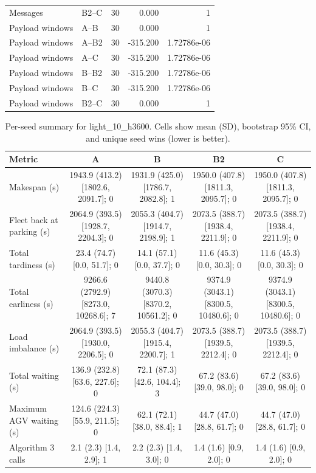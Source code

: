 \begin{table}[t]
\begin{tabular}{llrrr}
Messages & B2--C & 30 & 0.000 & 1 \\
Payload windows & A--B & 30 & 0.000 & 1 \\
Payload windows & A--B2 & 30 & -315.200 & 1.72786e-06 \\
Payload windows & A--C & 30 & -315.200 & 1.72786e-06 \\
Payload windows & B--B2 & 30 & -315.200 & 1.72786e-06 \\
Payload windows & B--C & 30 & -315.200 & 1.72786e-06 \\
Payload windows & B2--C & 30 & 0.000 & 1 \\
\bottomrule
\end{tabular}
\end{table}

\begin{table}[t]
\centering
\caption{Per-seed summary for light\_10\_h3600. Cells show mean (SD), bootstrap 95\% CI, and unique seed wins (lower is better).}
\label{tab:light-10-h3600}
\begin{tabular}{lcccc}
\toprule
Metric & A & B & B2 & C \\
\midrule
Makespan (s) & 1943.9 (413.2) [1802.6, 2091.7]; 0 & 1931.9 (425.0) [1786.7, 2082.8]; 1 & 1950.0 (407.8) [1811.3, 2095.7]; 0 & 1950.0 (407.8) [1811.3, 2095.7]; 0 \\
Fleet back at parking (s) & 2064.9 (393.5) [1928.7, 2204.3]; 0 & 2055.3 (404.7) [1914.7, 2198.9]; 1 & 2073.5 (388.7) [1938.4, 2211.9]; 0 & 2073.5 (388.7) [1938.4, 2211.9]; 0 \\
Total tardiness (s) & 23.4 (74.7) [0.0, 51.7]; 0 & 14.1 (57.1) [0.0, 37.7]; 0 & 11.6 (45.3) [0.0, 30.3]; 0 & 11.6 (45.3) [0.0, 30.3]; 0 \\
Total earliness (s) & 9266.6 (2792.9) [8273.0, 10268.6]; 7 & 9440.8 (3070.3) [8370.2, 10561.2]; 0 & 9374.9 (3043.1) [8300.5, 10480.6]; 0 & 9374.9 (3043.1) [8300.5, 10480.6]; 0 \\
Load imbalance (s) & 2064.9 (393.5) [1930.0, 2206.5]; 0 & 2055.3 (404.7) [1915.4, 2200.7]; 1 & 2073.5 (388.7) [1939.5, 2212.4]; 0 & 2073.5 (388.7) [1939.5, 2212.4]; 0 \\
Total waiting (s) & 136.9 (232.8) [63.6, 227.6]; 0 & 72.1 (87.3) [42.6, 104.4]; 3 & 67.2 (83.6) [39.0, 98.0]; 0 & 67.2 (83.6) [39.0, 98.0]; 0 \\
Maximum AGV waiting (s) & 124.6 (224.3) [55.9, 211.5]; 0 & 62.1 (72.1) [38.0, 88.4]; 1 & 44.7 (47.0) [28.8, 61.7]; 0 & 44.7 (47.0) [28.8, 61.7]; 0 \\
Algorithm 3 calls & 2.1 (2.3) [1.4, 2.9]; 1 & 2.2 (2.3) [1.4, 3.0]; 0 & 1.4 (1.6) [0.9, 2.0]; 0 & 1.4 (1.6) [0.9, 2.0]; 0 \\

\end{tabular}
\end{table}
